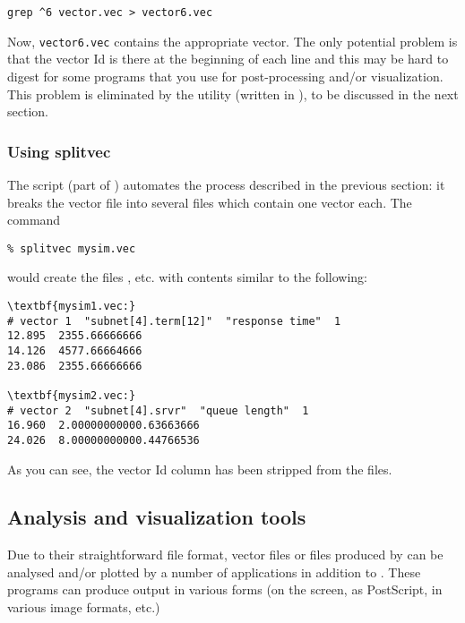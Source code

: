 \begin{verbatim}
grep ^6 vector.vec > vector6.vec
\end{verbatim}


Now, \texttt{vector6.vec} contains the appropriate vector. The only
potential problem is that the vector Id is there at the beginning of
each line and this may be hard to digest for some programs that you
use for post-processing and/or visualization. This problem is
eliminated by the {\opp}  utility (written in
), to be discussed in the next section.




\subsubsection{Using splitvec}

The  script (part of {\opp}) automates the process described
in the previous section: it breaks the vector file into several files which
contain one vector each. The command

\begin{verbatim}
% splitvec mysim.vec
\end{verbatim}

would create the files ,  etc. with
contents similar to the following:

\begin{Verbatim}[commandchars=\\\{\}]
\textbf{mysim1.vec:}
# vector 1  "subnet[4].term[12]"  "response time"  1
12.895  2355.66666666
14.126  4577.66664666
23.086  2355.66666666

\textbf{mysim2.vec:}
# vector 2  "subnet[4].srvr"  "queue length"  1
16.960  2.00000000000.63663666
24.026  8.00000000000.44766536
\end{Verbatim}


As you can see, the vector Id column has been stripped from the files.




\subsection{Analysis and visualization tools}

Due to their straightforward file format, vector files or files
produced by  can be analysed and/or plotted by
a number of applications in addition to .
These programs can produce output in various forms (on the screen,
as PostScript, in various image formats, etc.)

